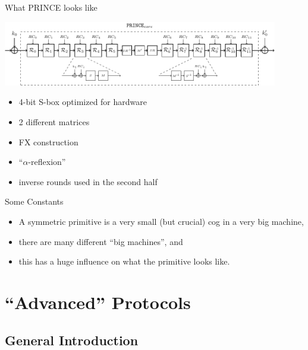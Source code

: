 \documentclass[presentation,aspectratio=1610]{beamer}
\begin{document}
\begin{frame}{What PRINCE looks like}
  \begin{center}
    \includegraphics[width=12cm]{./figures/prince}

    \begin{itemize}
    \item 4-bit S-box optimized for hardware
    \item 2 different matrices
    \item FX construction
    \item ``$\alpha$-reflexion''
    \item inverse rounds used in the second half
    \end{itemize}

  \end{center}
\end{frame}


\begin{frame}{Some Constants}
  \begin{itemize}
    \setlength\itemsep{1cm}
    \large
  \item A symmetric primitive is a very \alert{small} (but crucial) cog in a
    very big machine, \pause
  \item there are many \alert{different} ``big machines'', and \pause
  \item this has a \alert{huge influence} on what the primitive looks like.
  \end{itemize}
\end{frame}


\section{``Advanced'' Protocols}

\subsection{General Introduction}
\end{document}
